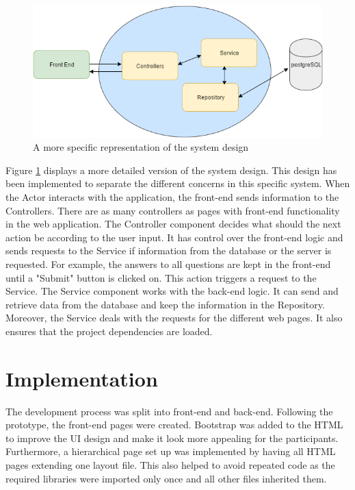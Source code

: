 \documentclass{l4proj}
\begin{document}
\begin{figure}[H]
\centering
\includegraphics[width=12cm]{moreSpecificDesign.png}
\caption{A more specific representation of the system design}
\label{moreSpecificDesign}
\end{figure}

Figure \ref{moreSpecificDesign} displays a more detailed version of the system design. This design has been implemented to separate the different concerns in this specific system. When the Actor interacts with the application, the front-end sends information to the Controllers. There are as many controllers as pages with front-end functionality in the web application. The Controller component decides what should the next action be according to the user input. It has control over the front-end logic and sends requests to the Service if information from the database or the server is requested. For example, the answers to all questions are kept in the front-end until a "Submit" button is clicked on. This action triggers a request to the Service. The Service component works with the back-end logic. It can send and retrieve data from the database and keep the information in the Repository. Moreover, the Service deals with the requests for the different web pages. It also ensures that the project dependencies are loaded.   

\section{Implementation}

The development process was split into front-end and back-end. Following the prototype, the front-end pages were created. Bootstrap was added to the HTML to improve the UI design and make it look more appealing for the participants. Furthermore, a hierarchical page set up was implemented by having all HTML pages extending one layout file. This also helped to avoid repeated code as the required libraries were imported only once and all other files inherited them. 
\end{document}

